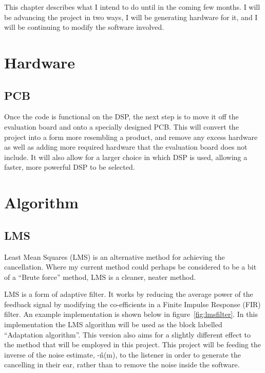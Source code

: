 This chapter describes what I intend to do until in the coming few months.
I will be advancing the project in two ways, I will be generating hardware for it, and I will be continuing to modify the software involved.

\section{Hardware}
\subsection{PCB}
Once the code is functional on the DSP, the next step is to move it off the evaluation board and onto a specially designed PCB.
This will convert the project into a form more resembling a product, and remove any excess hardware as well as adding more required hardware that the evaluation board does not include.
It will also allow for a larger choice in which DSP is used, allowing a faster, more powerful DSP to be selected.

\section{Algorithm}
\subsection{LMS}
\label{sec:LMS}
Least Mean Squares (LMS) is an alternative method for achieving the cancellation.
Where my current method could perhaps be considered to be a bit of a ``Brute force'' method, LMS is a cleaner, neater method.

LMS is a form of adaptive filter.
It works by reducing the average power of the feedback signal by modifying the co-efficients in a Finite Impulse Response (FIR) filter.
An example implementation is shown below in figure~\ref{fig:lmsfilter}.
In this implementation the LMS algorithm will be used as the block labelled ``Adaptation algorithm''.
This version also aims for a slightly different effect to the method that will be employed in this project.
This project will be feeding the inverse of the noise estimate, -\^{n}(m), to the listener in order to generate the cancelling in their ear, rather than to remove the noise inside the software.

